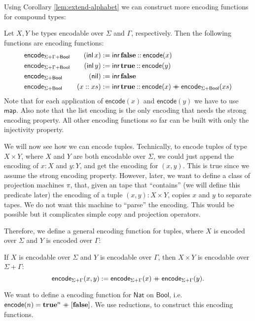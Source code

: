 \documentclass{psartcl}
\newcommand{\MS}[1]{\textsf{#1}}
\newcommand{\nil}{\MS{nil}}
\newcommand{\cons}{\mathbin{::}}
\newcommand\mdoubleplus{\ensuremath{\mathbin{+\mkern-10mu+}}}
\newcommand{\app}{\mdoubleplus}
\newcommand{\Bool}{\MS{Bool}}
\newcommand{\Nat}{\MS{Nat}}
\newcommand{\true}{\mathbf{true}}
\newcommand{\false}{\mathbf{false}}
\newcommand{\Tau}{\Gamma}
\DeclareMathOperator{\inl}{\ensuremath{\MS{inl}}}
\DeclareMathOperator{\inr}{\ensuremath{\MS{inr}}}
\newcommand{\map}{\ensuremath{\MS{map}}}
\begin{document}
Using Corollary \ref{lem:extend-alphabet} we can construct more encoding functions for compound types:
\begin{corollary}
  \label{lem:code-compound}
  Let $X, Y$ be types encodable over $\Sigma$ and $\Tau$, respectively.
  Then the following functions are encoding functions:
  \begin{alignat*}{3}
    \MS{encode}&_{\Sigma + \Tau + \Bool}&(\inl x) &:= \inr \false \cons \MS{encode}(x) \\
    \MS{encode}&_{\Sigma + \Tau + \Bool}&(\inl y) &:= \inr \true  \cons \MS{encode}(y) \\
    \MS{encode}&_{\Sigma + \Bool}& (\nil)         &:= \inr \false \\
    \MS{encode}&_{\Sigma + \Bool}& (x :: xs)      &:= \inr \true \cons \MS{encode}(x) \app \MS{encode}_{\Sigma + \Bool}(xs)
  \end{alignat*}
  Note that for each application of $\MS{encode}(x)$ and $\MS{encode}(y)$ we have to use $\map$.
  Also note that the list encoding is the only encoding that needs the strong encoding property.  All other encoding functions so far can be built
  with only the injectivity property.
\end{corollary}

We will now see how we can encode tuples.
Technically, to encode tuples of type $X \times Y$, where $X$ and $Y$ are both encodable over $\Sigma$, we could just append the encoding of $x:X$
and $y:Y$, and get the encoding for $(x, y)$.
This is true since we assume the strong encoding property.
However, later, we want to define a class of projection machines $\pi$, that, given an tape that ``contains'' (we will define this predicate later)
the encoding of a tuple $(x,y) : X \times Y$, copies $x$ and $y$ to separate tapes.
We do not want this machine to ``parse'' the encoding.  This would be possible but it complicates simple copy and projection operators.

Therefore, we define a general encoding function for tuples, where $X$ is encoded over $\Sigma$ and $Y$ is encoded over $\Tau$:
\begin{lemma}
  If $X$ is encodable over $\Sigma$ and $Y$ is encodable over $\Tau$, then $X \times Y$ is encodable over $\Sigma + \Tau$:
  $$\MS{encode}_{\Sigma+\Tau}(x,y) := \MS{encode}_{\Sigma+\Tau}(x) \app \MS{encode}_{\Sigma+\Tau}(y).$$
\end{lemma}


We want to define a encoding function for $\Nat$ on $\Bool$, i.e. $\MS{encode}(n)=\true^n \app [\false]$.
We use reductions, to construct this encoding functions.
\end{document}
